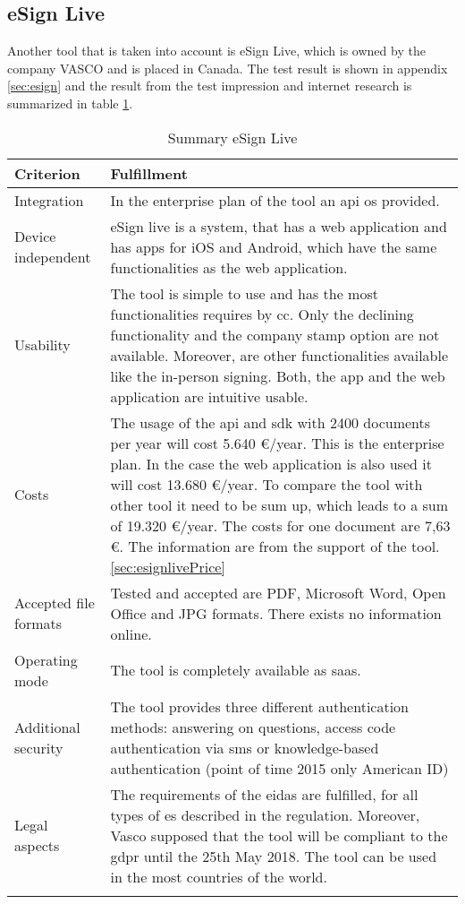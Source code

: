 \subsection{eSign Live}
Another tool that is taken into account is eSign Live, which is owned by the company VASCO and is placed in Canada. The test result is shown in appendix \ref{sec:esign} and the result from the test impression and internet research is summarized in table \ref{tab:esign}.
	\begin{longtable}{|p{4cm}|p{10cm}|} \hline
		\rowcolor{Gray}Criterion & Fulfillment \\ \hline
		Integration & In the enterprise plan of the tool an \gls{api} os provided. \parencite{esign2018info} \\ \hline
		Device independent & eSign live is a system, that has a web application and has \glspl{app} for iOS and Android, which have the same functionalities as the web application. \parencite{esign2018info} \\ \hline
		Usability & The tool is simple to use and has the most functionalities requires by \gls{cc}. Only the declining functionality and the company stamp option are not available. Moreover, are other functionalities available like the in-person signing. Both, the \gls{app} and the web application are intuitive usable.  \\ \hline
		Costs & The usage of the \gls{api} and \gls{sdk} with 2400 documents per year will cost 5.640 \euro/year. This is the enterprise plan. In the case the web application is also used it will cost 13.680 \euro/year. To compare the tool with other tool it need to be sum up, which leads to a sum of 19.320 \euro/year. The costs for one document are 7,63 \euro. The information are from the support of the tool. \ref{sec:esignlivePrice} \\ \hline
		Accepted file formats & Tested and accepted are \gls{PDF}, Microsoft Word, Open Office and JPG formats. There exists no information online.\\ \hline
		Operating mode & The tool is completely available as \gls{saas}.\\ \hline
		Additional security & The tool provides three different authentication methods: answering on questions, access code authentication via \gls{sms} or knowledge-based authentication (point of time 2015 only American ID) \parencite{esign2018security} \\ \hline
		Legal aspects & The requirements of the \gls{eidas} are fulfilled, for all types of \gls{es} described in the regulation. Moreover, Vasco supposed that the tool will be compliant to the \gls{gdpr} until the 25th May 2018. The tool can be used in the most countries of the world. \parencite{esign2018eidas,esign2018legal} \\ \hline
	\caption{Summary eSign Live}
	\label{tab:esign}
	\end{longtable}

